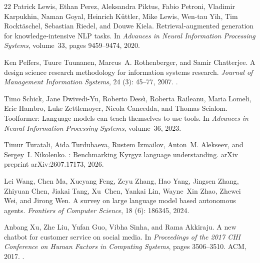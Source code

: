 \begin{thebibliography}{22}
Patrick Lewis, Ethan Perez, Aleksandra Piktus, Fabio Petroni, Vladimir
  Karpukhin, Naman Goyal, Heinrich K{\"u}ttler, Mike Lewis, Wen-tau Yih, Tim
  Rockt{\"a}schel, Sebastian Riedel, and Douwe Kiela.
\newblock Retrieval-augmented generation for knowledge-intensive {NLP} tasks.
\newblock In \emph{Advances in Neural Information Processing Systems},
  volume~33, pages 9459--9474, 2020.

Ken Peffers, Tuure Tuunanen, Marcus~A. Rothenberger, and Samir Chatterjee.
\newblock A design science research methodology for information systems
  research.
\newblock \emph{Journal of Management Information Systems}, 24
  (3): 45--77, 2007.
\newblock {}.

Timo Schick, Jane Dwivedi-Yu, Roberto Dess{\`\i}, Roberta Raileanu, Maria
  Lomeli, Eric Hambro, Luke Zettlemoyer, Nicola Cancedda, and Thomas Scialom.
\newblock Toolformer: Language models can teach themselves to use tools.
\newblock In \emph{Advances in Neural Information Processing Systems},
  volume~36, 2023.

Timur Turatali, Aida Turdubaeva, Rustem Izmailov, Anton~M. Alekseev, and
  Sergey~I. Nikolenko.
: Benchmarking {K}yrgyz language understanding.
\newblock arXiv preprint arXiv:2607.17173, 2026.

Lei Wang, Chen Ma, Xueyang Feng, Zeyu Zhang, Hao Yang, Jingsen Zhang, Zhiyuan
  Chen, Jiakai Tang, Xu~Chen, Yankai Lin, Wayne~Xin Zhao, Zhewei Wei, and
  Jirong Wen.
\newblock A survey on large language model based autonomous agents.
\newblock \emph{Frontiers of Computer Science}, 18 (6):
  186345, 2024.

Anbang Xu, Zhe Liu, Yufan Guo, Vibha Sinha, and Rama Akkiraju.
\newblock A new chatbot for customer service on social media.
\newblock In \emph{Proceedings of the 2017 CHI Conference on Human Factors in
  Computing Systems}, pages 3506--3510. ACM, 2017.
\newblock {}.


\end{thebibliography}
